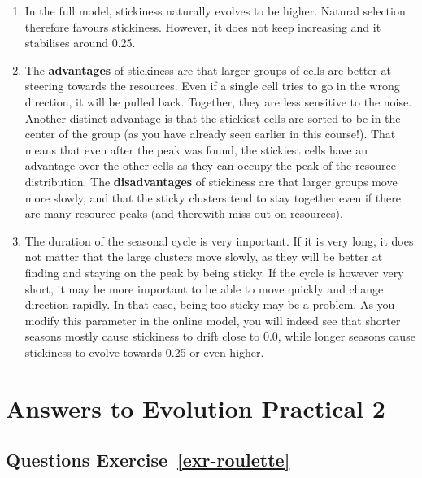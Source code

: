 \documentclass[
  letterpaper,
  DIV=11,
  numbers=noendperiod]{scrreprt}
\providecommand{\tightlist}{%
  \setlength{\itemsep}{0pt}\setlength{\parskip}{0pt}}\usepackage{longtable,booktabs,array}
\theoremstyle{definition}
\theoremstyle{remark}
\begin{document}
\begin{enumerate}
\def\labelenumi{\alph{enumi}.}
\tightlist
\item
  In the full model, stickiness naturally evolves to be higher. Natural
  selection therefore favours stickiness. However, it does not keep
  increasing and it stabilises around 0.25.
\item
  The \textbf{advantages} of stickiness are that larger groups of cells
  are better at steering towards the resources. Even if a single cell
  tries to go in the wrong direction, it will be pulled back. Together,
  they are less sensitive to the noise. Another distinct advantage is
  that the stickiest cells are sorted to be in the center of the group
  (as you have already seen earlier in this course!). That means that
  even after the peak was found, the stickiest cells have an advantage
  over the other cells as they can occupy the peak of the resource
  distribution. The \textbf{disadvantages} of stickiness are that larger
  groups move more slowly, and that the sticky clusters tend to stay
  together even if there are many resource peaks (and therewith miss out
  on resources).
\item
  The duration of the seasonal cycle is very important. If it is very
  long, it does not matter that the large clusters move slowly, as they
  will be better at finding and staying on the peak by being sticky. If
  the cycle is however very short, it may be more important to be able
  to move quickly and change direction rapidly. In that case, being too
  sticky may be a problem. As you modify this parameter in the online
  model, you will indeed see that shorter seasons mostly cause
  stickiness to drift close to 0.0, while longer seasons cause
  stickiness to evolve towards 0.25 or even higher.
\end{enumerate}

\section{Answers to Evolution Practical
2}\label{answers-to-evolution-practical-2}

\subsection{\texorpdfstring{Questions
Exercise~\ref{exr-roulette}}{Questions Exercise~}}\label{questions-exr-roulette}
\end{document}
